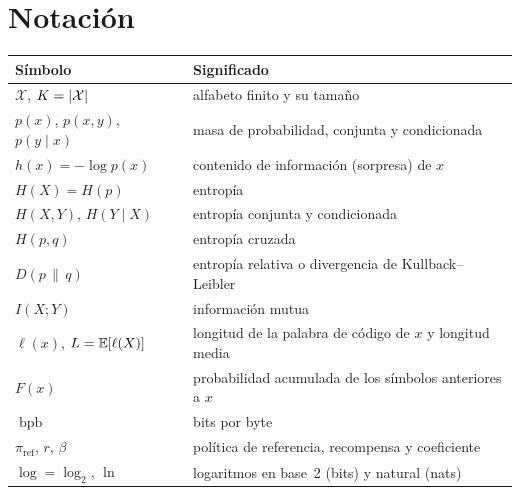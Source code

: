 \documentclass[11pt,a4paper,twoside,openany]{book}
\newcommand{\KL}[2]{D(#1\,\|\,#2)}
\newcommand{\X}{\mathcal{X}}
\newcommand{\pref}{\pi_{\mathrm{ref}}}
\DeclareMathOperator{\bpb}{bpb}
\begin{document}
\section*{Notación}
\begin{center}
\begin{tabular}{@{}ll@{}}
\toprule
Símbolo & Significado \\
\midrule
$\X$, $K=\abs{\X}$ & alfabeto finito y su tamaño \\
$p(x)$, $p(x,y)$, $p(y\mid x)$ & masa de probabilidad, conjunta y condicionada \\
$h(x)=-\log p(x)$ & contenido de información (sorpresa) de $x$ \\
$H(X)=H(p)$ & entropía \\
$H(X,Y)$, $H(Y\mid X)$ & entropía conjunta y condicionada \\
$H(p,q)$ & entropía cruzada \\
$\KL{p}{q}$ & entropía relativa o divergencia de Kullback--Leibler \\
$I(X;Y)$ & información mutua \\
$\ell(x)$, $L=\mathbb{E}[\ell(X)]$ & longitud de la palabra de código de $x$ y longitud media \\
$F(x)$ & probabilidad acumulada de los símbolos anteriores a $x$ \\
$\bpb$ & bits por byte \\
$\pref$, $r$, $\beta$ & política de referencia, recompensa y coeficiente \\
$\log=\log_2$, $\ln$ & logaritmos en base~2 (bits) y natural (nats) \\
\bottomrule
\end{tabular}
\end{center}

\tableofcontents

\mainmatter






\appendix


\backmatter

\end{document}

